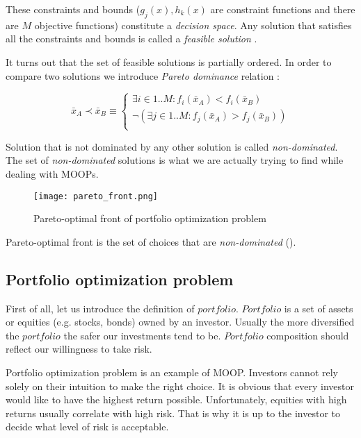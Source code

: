 These constraints and bounds ($g_{j}(x) , h_{k}(x) $ are constraint functions and there are $M$ objective functions) constitute a \emph{decision space}. 
\cite{Deb:2001:MOU:559152}
Any solution that satisfies all the constraints and bounds is called a \emph{feasible solution} \cite{Deb:2001:MOU:559152}.

It turns out that the set of feasible solutions is partially ordered.
In order to compare two solutions we introduce \emph{Pareto dominance} relation \cite{Phd}:

\begin{equation}
\bar{x}_{A}  \prec \bar{x}_{B} \equiv
      \begin{cases}
     \exists{i \in 1..M} : f_{i}(\bar{x}_{A}) < f_{i}(\bar{x}_{B}) \\
     \neg (\exists{j \in 1..M} : f_{j}(\bar{x}_{A}) > f_{j}(\bar{x}_{B}))  \\ 
			  
      
\end{cases} 
\end{equation}

Solution that is not dominated by any other solution is called \emph{non-dominated}. 
The set of \emph{non-dominated} solutions is what we are actually trying to find while dealing with MOOPs.



\begin{figure}[ht]
  \begin{center}
    \texttt{[image: pareto\_front.png]}
  \end{center}
  \caption{Pareto-optimal front of portfolio optimization problem}
\end{figure}


Pareto-optimal front is the set of choices that are \emph{non-dominated} (\cite{Dre}).
 

\subsection{Portfolio optimization problem}

First of all, let us introduce the definition of $portfolio$.
	$Portfolio$ is a set of assets or equities (e.g. stocks, bonds) owned by an investor.
	Usually the more diversified the $portfolio$ the safer our investments tend to be.
	$Portfolio$ composition should reflect our willingness to take risk.

Portfolio optimization problem is an example of MOOP.
Investors cannot rely solely on their intuition to make the right choice.
It is obvious that every investor would like to have the highest return possible.
Unfortunately, equities with high returns usually correlate with high risk. 
That is why it is up to the investor to decide what level of risk is acceptable.

